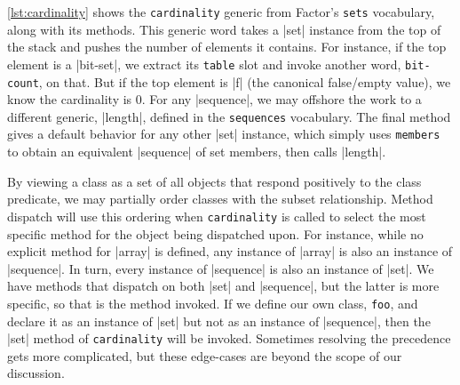 
\vref{lst:cardinality} shows the \Verb|cardinality| generic from Factor's
\Verb|sets| vocabulary, along with its methods.  This generic word takes a
\factor|set| instance from the top of the stack and pushes the number of
elements it contains.  For instance, if the top element is a \factor|bit-set|,
we extract its \Verb|table| slot and invoke another word, \Verb|bit-count|,
on that.  But if the top element is \factor|f| (the canonical false/empty
value), we know the cardinality is $0$.  For any \factor|sequence|, we may
offshore the work to a different generic, \factor|length|, defined in the
\Verb|sequences| vocabulary.  The final method gives a default behavior for
any other \factor|set| instance, which simply uses \Verb|members| to obtain
an equivalent \factor|sequence| of set members, then calls \factor|length|.

By viewing a class as a set of all objects that respond positively to the class
predicate, we may partially order classes with the subset relationship.  Method
dispatch will use this ordering when \Verb|cardinality| is called to select
the most specific method for the object being dispatched upon.  For instance,
while no explicit method for \factor|array| is defined, any instance of
\factor|array| is also an instance of \factor|sequence|.  In turn, every
instance of \factor|sequence| is also an instance of \factor|set|.  We have
methods that dispatch on both \factor|set| and \factor|sequence|, but the
latter is more specific, so that is the method invoked.  If we define our own
class, \Verb|foo|, and declare it as an instance of \factor|set| but not as
an instance of \factor|sequence|, then the \factor|set| method of
\Verb|cardinality| will be invoked.  Sometimes resolving the precedence gets
more complicated, but these edge-cases are beyond the scope of our discussion.
